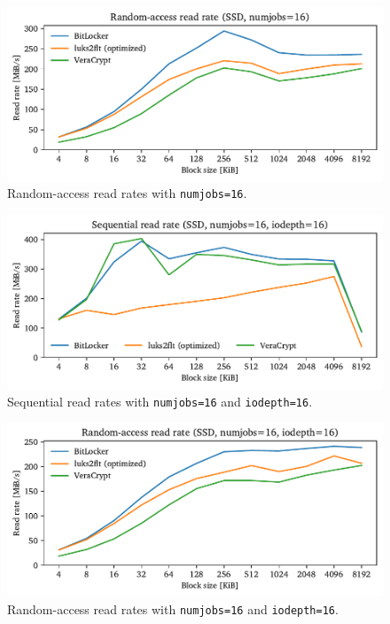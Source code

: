 \begin{figure}[htb!]
	\center
	\includegraphics[scale=1]{../fig/performance.hwexperiments.optrandthreads.pdf}
	\caption[
		Random-access read rates with \texttt{numjobs=16}
	]{
		Random-access read rates with \texttt{numjobs=16}. 
	}
	\label{fig:performance.hwexperiments.optrandthreads}
\end{figure}

\begin{figure}[htb!]
	\center
	\includegraphics[scale=1]{../fig/performance.hwexperiments.optseqthreadsqueue.pdf}
	\caption[
		Sequential read rates with \texttt{numjobs=16} and \texttt{iodepth=16}
	]{
		Sequential read rates with \texttt{numjobs=16} and \texttt{iodepth=16}. 
	}
	\label{fig:performance.hwexperiments.optseqthreadsqueue}
\end{figure}

\begin{figure}[htb!]
	\center
	\includegraphics[scale=1]{../fig/performance.hwexperiments.optrandthreadsqueue.pdf}
	\caption[
		Random-access read rates with \texttt{numjobs=16} and \texttt{iodepth=16}
	]{
		Random-access read rates with \texttt{numjobs=16} and \texttt{iodepth=16}. 
	}
	\label{fig:performance.hwexperiments.optrandthreadsqueue}
\end{figure}

